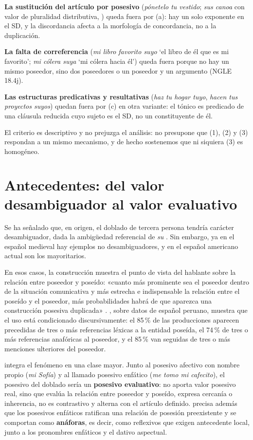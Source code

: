 \documentclass[12pt,a4paper]{article}
\begin{document}
\textbf{La sustitución del artículo por posesivo} (\textit{pónetelo tu vestido}; \textit{sus canoa} con valor de pluralidad distributiva, \textcite{morenofernandez2022}) queda fuera por (a): hay un solo exponente en el SD, y la discordancia afecta a la morfología de concordancia, no a la duplicación.

\textbf{La falta de correferencia} (\textit{mi libro favorito suyo} `el libro de él que es mi favorito'; \textit{mi cólera suya} `mi cólera hacia él') queda fuera porque no hay un mismo poseedor, sino dos poseedores o un poseedor y un argumento (NGLE 18.4j).

\textbf{Las estructuras predicativas y resultativas} (\textit{haz tu hogar tuyo}, \textit{hacen tus proyectos suyos}) quedan fuera por (c) en otra variante: el tónico es predicado de una cláusula reducida cuyo sujeto es el SD, no un constituyente de él.

El criterio es descriptivo y no prejuzga el análisis: no presupone que (1), (2) y (3) respondan a un mismo mecanismo, y de hecho sostenemos que ni siquiera (3) es homogéneo.

\section{Antecedentes: del valor desambiguador al valor evaluativo}

Se ha señalado que, en origen, el doblado de tercera persona tendría carácter desambiguador, dada la ambigüedad referencial de \textit{su} \parencite{companycompany1994,companycompany1995,huertaflores2009}. Sin embargo, ya en el español medieval hay ejemplos no desambiguadores, y en el español americano actual son los mayoritarios.

En esos casos, la construcción muestra el punto de vista del hablante sobre la relación entre poseedor y poseído: «cuanto más prominente sea el poseedor dentro de la situación comunicativa y más estrecha e indispensable la relación entre el poseído y el poseedor, más probabilidades habrá de que aparezca una construcción posesiva duplicada» \parencite[188]{companycompanyhuertaflores2017}. \textcite{risco2013}, sobre datos de español peruano, muestra que el uso está condicionado discursivamente: el 85\,\% de las producciones aparecen precedidas de tres o más referencias léxicas a la entidad poseída, el 74\,\% de tres o más referencias anafóricas al poseedor, y el 85\,\% van seguidas de tres o más menciones ulteriores del poseedor.

\textcite{eguren2016,eguren2018,eguren2019} integra el fenómeno en una clase mayor. Junto al posesivo afectivo con nombre propio (\textit{mi Sofía}) y al llamado posesivo enfático (\textit{me tomo mi cafecito}), el posesivo del doblado sería un \textbf{posesivo evaluativo}: no aporta valor posesivo real, sino que evalúa la relación entre poseedor y poseído, expresa cercanía o inherencia, no es contrastivo y alterna con el artículo definido. \textcite{eguren2023} precisa además que los posesivos enfáticos ratifican una relación de posesión preexistente y se comportan como \textbf{anáforas}, es decir, como reflexivos que exigen antecedente local, junto a los pronombres enfáticos y el dativo aspectual.
\end{document}
